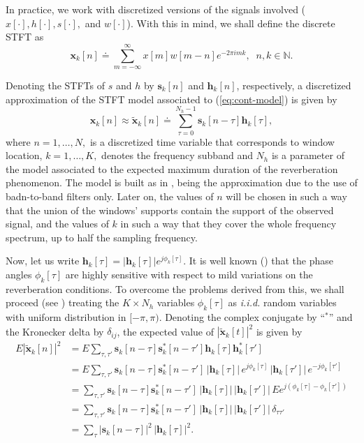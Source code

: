 \documentclass[12pt]{article}
\begin{document}
In practice, we work with discretized versions of the signals involved ($x[\cdot],h[\cdot],s[\cdot],$ and $w[\cdot]$). With this in mind, we shall define the discrete STFT as
%
\begin{equation}\nonumber
\mathbf{x}_k[n] \doteq \sum_{m =-\infty}^{\infty}x[m]w[m-n]e^{-2\pi i m k},\;\;n,k\in\mathbb{N}.
\end{equation}
%

Denoting the STFTs of $s$ and $h$ by $ \mathbf{s}_k[n]$ and $\mathbf{h}_k[n]$, respectively, a discretized approximation of the STFT model associated to (\ref{eq:cont-model}) is given by
%
\begin{equation}
\mathbf{x}_k[n] \approx \tilde{\mathbf{x}}_k[n] \doteq \sum_{\tau = 0}^{N_h-1} \mathbf{s}_k[n-\tau] \mathbf{h}_k[\tau],
\end{equation}
%
where $n=1,\ldots, N,$ is a discretized time variable that corresponds to window location, $k=1,\ldots, K,$ denotes the frequency subband and $N_h$ is a parameter of the model associated to the expected maximum duration of the reverberation phenomenon. The model is built as in \cite{avargel2007system}, being the approximation due to the use of badn-to-band filters only. Later on, the values of $n$ will be chosen in such a way that the union of the windows' supports contain the support of the observed signal, and the values of $k$ in such a way that they cover the whole frequency spectrum, up to half the sampling frequency.

Now, let us write $\mathbf{h}_k[\tau] = |\mathbf{h}_k[\tau]|e^{j\phi_k[\tau]}$. It is well known (\cite{yegnanarayana1998}) that the phase angles $\phi_k[\tau]$ are highly sensitive with respect to mild variations on the reverberation conditions. To overcome the problems derived from this, we shall proceed (see \cite{kameoka2009}) treating the $K\times N_h$ variables $\phi_k[\tau]$ as \emph{i.i.d.} random variables  with uniform distribution in $[-\pi,\pi)$. Denoting the complex conjugate by ``$^*$'' and the Kronecker delta by $\delta_{ij}$, the expected value of $|\tilde{\mathbf{x}}_k[t]|^2$ is given by
%
\begin{align}
E|\tilde{\mathbf{x}}_k[n]|^2 &= E \sum_{\tau,\tau'} \mathbf{s}_k[n-\tau] \mathbf{s}_k^*[n-\tau'] \mathbf{h}_k[\tau] \mathbf{h}^*_k[\tau'] \nonumber\\
&= E \sum_{\tau,\tau'} \mathbf{s}_k[n-\tau] \mathbf{s}_k^*[n-\tau'] \,|\mathbf{h}_k[\tau]|\,e^{j\phi_k[\tau]}\, |\mathbf{h}_k[\tau']|\,e^{-j\phi_k[\tau']} \nonumber\\
&= \sum_{\tau,\tau'} \mathbf{s}_k[n-\tau] \mathbf{s}_k^*[n-\tau']\, |\mathbf{h}_k[\tau]| \,|\mathbf{h}_k[\tau']|\,Ee^{j(\phi_k[\tau]-\phi_k[\tau'])} \nonumber\\
&= \sum_{\tau,\tau'} \mathbf{s}_k[n-\tau] \mathbf{s}_k^*[n-\tau']\, |\mathbf{h}_k[\tau]|\, |\mathbf{h}_k[\tau']|\, \delta_{\tau \tau'} \nonumber\\
&= \sum_{\tau} |\mathbf{s}_k[n-\tau]|^2 \,|\mathbf{h}_k[\tau]|^2. \nonumber
\end{align}
\end{document}
